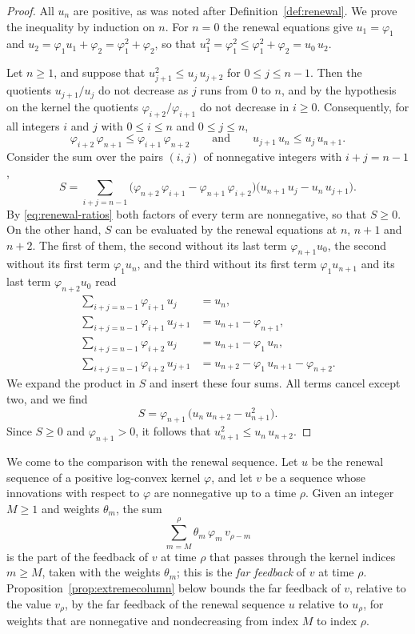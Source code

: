 \documentclass{amsart}
\theoremstyle{definition}
\theoremstyle{remark}
\numberwithin{equation}{section}
\begin{document}
\begin{proof}
All $u_n$ are positive, as was noted after Definition~\ref{def:renewal}. We
prove the inequality by induction on $n$. For $n=0$ the renewal equations
give $u_1=\varphi_1$ and $u_2=\varphi_1u_1+\varphi_2=\varphi_1^2+\varphi_2$,
so that $u_1^2=\varphi_1^2\le\varphi_1^2+\varphi_2=u_0\,u_2$.

Let $n\ge1$, and suppose that $u_{j+1}^2\le u_j\,u_{j+2}$ for
$0\le j\le n-1$. Then the quotients $u_{j+1}/u_j$ do not decrease as $j$ runs
from $0$ to $n$, and by the hypothesis on the kernel the quotients
$\varphi_{i+2}/\varphi_{i+1}$ do not decrease in $i\ge0$. Consequently, for
all integers $i$ and $j$ with $0\le i\le n$ and $0\le j\le n$,
\begin{equation}\label{eq:renewal-ratios}
\varphi_{i+2}\,\varphi_{n+1}\le\varphi_{i+1}\,\varphi_{n+2}
\qquad\text{and}\qquad
u_{j+1}\,u_n\le u_j\,u_{n+1} .
\end{equation}
Consider the sum over the pairs $(i,j)$ of nonnegative integers with
$i+j=n-1$,
\[
S=\sum_{i+j=n-1}\bigl(\varphi_{n+2}\,\varphi_{i+1}
-\varphi_{n+1}\,\varphi_{i+2}\bigr)
\bigl(u_{n+1}\,u_j-u_n\,u_{j+1}\bigr).
\]
By \eqref{eq:renewal-ratios} both factors of every term are nonnegative, so
that $S\ge0$. On the other hand, $S$ can be evaluated by the renewal
equations at $n$, $n+1$ and $n+2$. The first of them, the second without its
last term $\varphi_{n+1}u_0$, the second without its first term
$\varphi_1u_n$, and the third without its first term $\varphi_1u_{n+1}$ and
its last term $\varphi_{n+2}u_0$ read
\begin{align*}
\sum_{i+j=n-1}\varphi_{i+1}\,u_j&=u_n,\\
\sum_{i+j=n-1}\varphi_{i+1}\,u_{j+1}&=u_{n+1}-\varphi_{n+1},\\
\sum_{i+j=n-1}\varphi_{i+2}\,u_j&=u_{n+1}-\varphi_1\,u_n,\\
\sum_{i+j=n-1}\varphi_{i+2}\,u_{j+1}&=u_{n+2}-\varphi_1\,u_{n+1}-\varphi_{n+2}.
\end{align*}
We expand the product in $S$ and insert these four sums. All terms cancel
except two, and we find
\[
S=\varphi_{n+1}\,\bigl(u_n\,u_{n+2}-u_{n+1}^2\bigr).
\]
Since $S\ge0$ and $\varphi_{n+1}>0$, it follows that
$u_{n+1}^2\le u_n\,u_{n+2}$.
\end{proof}

We come to the comparison with the renewal sequence. Let $u$ be the
renewal sequence of a positive log-convex kernel $\varphi$, and let $v$ be a
sequence whose innovations with respect to $\varphi$ are nonnegative up to a
time $\rho$. Given an integer $M\ge1$ and weights $\theta_m$, the sum
\[
\sum_{m=M}^{\rho}\theta_m\,\varphi_m\,v_{\rho-m}
\]
is the part of the feedback of $v$ at time $\rho$ that passes through the
kernel indices $m\ge M$, taken with the weights $\theta_m$; this is the
\emph{far feedback} of $v$ at time $\rho$.
Proposition~\ref{prop:extremecolumn} below bounds the far feedback of $v$,
relative to the value $v_\rho$, by the far feedback of the renewal sequence
$u$ relative to $u_\rho$, for weights that are nonnegative and nondecreasing
from index $M$ to index $\rho$.
\end{document}

